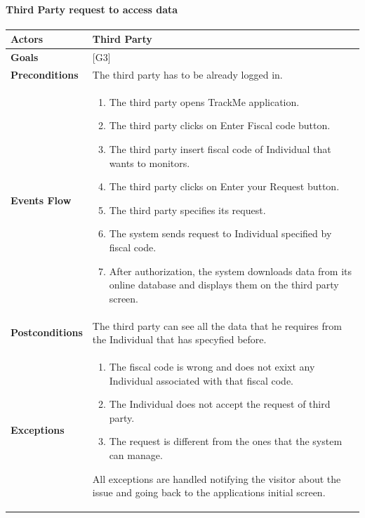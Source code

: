 \documentclass[12pt]{article}
\begin{document}
\paragraph{Third Party request to access data}
\begin{center}
    \begin{tabular} { |p{}|p{}| }
         \hline
         \textbf{Actors} & Third Party \\ 
         \hline
         \textbf{Goals} & {[G3]} \\ 
         \hline  
         \textbf{Preconditions} & The third party has to be already logged in. \\ 
         \hline
         \textbf{Events Flow} & \begin{enumerate}[topsep=0pt]
             \setlength{\itemsep}{0.5pt}
             \item The third party opens TrackMe application.
             \item The third party clicks on Enter Fiscal code button.
             \item The third party insert fiscal code of Individual that wants to monitors.
             \item The third party clicks on Enter your Request button. 
             \item The third party specifies its request.
             \item The system sends request to Individual specified by fiscal code.
             \item After authorization, the system downloads data from its online database and displays them on the third party screen.
             \end{enumerate} \\ 
        \hline
        \textbf{Postconditions} & The third party can see all the data that he requires from the Individual that has specyfied before. \\
        \hline 
        \textbf{Exceptions} & \begin{enumerate}[topsep=0pt] 
              \setlength{\itemsep}{0.5pt}
              \item The fiscal code is wrong and does not exixt any Individual associated with that fiscal code. 
              \item The Individual does not accept the request of third party. 
              \item The request is different from the ones that the system can manage. 
              \end{enumerate}
               All exceptions are handled notifying the visitor about the issue and going back to the applications initial screen.\\ 
        \hline
    \end{tabular}
\end{center}
  
\end{document}
